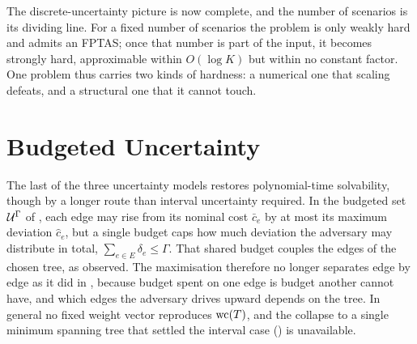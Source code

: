 The discrete-uncertainty picture is now complete, and the number of scenarios is its dividing line.
For a fixed number of scenarios the problem is only weakly hard and admits an FPTAS; once that number is part of the input, it becomes strongly hard, approximable within $O(\log K)$ but within no constant factor.
One problem thus carries two kinds of hardness: a numerical one that scaling defeats, and a structural one that it cannot touch.

%

\section{Budgeted Uncertainty}\label{sec:mm-budgeted}

The last of the three uncertainty models restores polynomial-time solvability, though by a longer route than interval uncertainty required.
In the budgeted set $\mathcal{U}^{\Gamma}$ of , each edge may rise from its nominal cost $\bar{c}_e$ by at most its maximum deviation $\hat{c}_e$, but a single budget caps how much deviation the adversary may distribute in total, $\sum_{e \in E} \delta_e \leq \Gamma$.
That shared budget couples the edges of the chosen tree, as  observed.
The maximisation therefore no longer separates edge by edge as it did in , because budget spent on one edge is budget another cannot have, and which edges the adversary drives upward depends on the tree.
In general no fixed weight vector reproduces $\mathrm{wc}(T)$, and the collapse to a single minimum spanning tree that settled the interval case () is unavailable.

